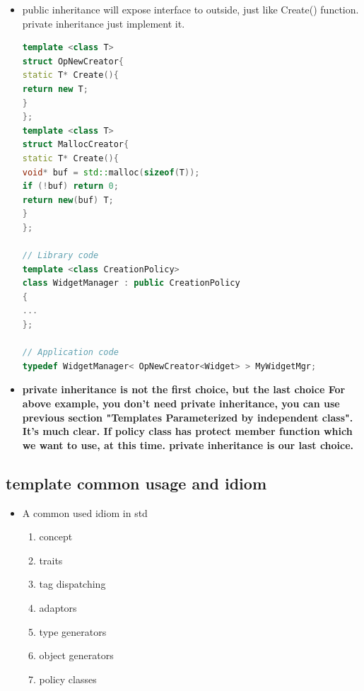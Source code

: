 \documentclass[a4paper,12pt,twoside]{book}
\begin{document}
\begin{itemize}
\item public inheritance will expose interface to outside, just like Create() function. private inheritance just implement it. 

\begin{lstlisting}[frame=single, language=c++]
template <class T>
struct OpNewCreator{
static T* Create(){
return new T;
}
};
template <class T>
struct MallocCreator{
static T* Create(){
void* buf = std::malloc(sizeof(T));
if (!buf) return 0;
return new(buf) T;
}
}; 

// Library code
template <class CreationPolicy>
class WidgetManager : public CreationPolicy
{
...
}; 

// Application code
typedef WidgetManager< OpNewCreator<Widget> > MyWidgetMgr; 
\end{lstlisting}

\item \textbf{private inheritance is not the first choice, but the last choice For above example, you don't need private inheritance, you can use previous section "Templates Parameterized by independent class". It's much clear. If policy class has protect member function which we want to use, at this time. private inheritance is our last choice. }
\end{itemize}



\subsection{template common usage and idiom}
\begin{itemize}
	
	\item A common used idiom in std
	\begin{enumerate}
		\item concept
		\item traits
		\item tag dispatching
		\item adaptors
		\item type generators
		\item object generators
		\item policy classes
	\end{enumerate}
\end{itemize}
\end{document}
